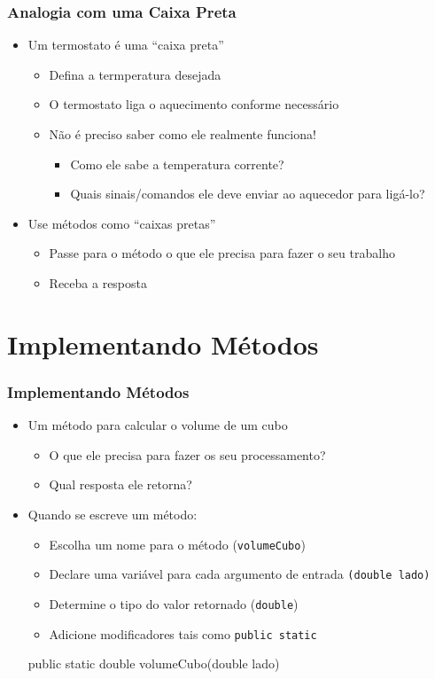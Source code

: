 \documentclass[xcolor={dvipsnames,table},aspectratio=169]{beamer}
\begin{document}
\begin{frame}\frametitle{Analogia com uma Caixa Preta}
\begin{itemize}
	\item Um termostato é uma ``caixa preta''
	\begin{itemize}
		\item Defina a termperatura desejada
		\item O termostato liga o aquecimento conforme necessário
		\item Não é preciso saber como ele realmente funciona!
		\begin{itemize}
			\item Como ele sabe a temperatura corrente?
			\item Quais sinais/comandos ele deve enviar ao aquecedor para ligá-lo?
		\end{itemize}
	\end{itemize}
	\item Use métodos como ``caixas pretas''
	\begin{itemize}
		\item Passe para o método o que ele precisa para fazer o seu trabalho
		\item Receba a resposta
	\end{itemize}
\end{itemize}
\end{frame}

\section{Implementando Métodos}

\begin{frame}[fragile]\frametitle{Implementando Métodos}
\begin{itemize}
	\item Um método para calcular o volume de um cubo
	\begin{itemize}
		\item O que ele precisa para fazer os seu processamento?
		\item Qual resposta ele retorna?
	\end{itemize}
	\item Quando se escreve um método:
	\begin{itemize}
		\item Escolha um nome para o método (\texttt{volumeCubo})
		\item Declare uma variável para cada argumento de entrada \texttt{(double lado)}
		\item Determine o tipo do valor retornado (\texttt{double})
		\item Adicione modificadores tais como \texttt{public static}
	\end{itemize}
\begin{javacode}
public static double volumeCubo(double lado)
\end{javacode}
\end{itemize}
\end{frame}
\end{document}
